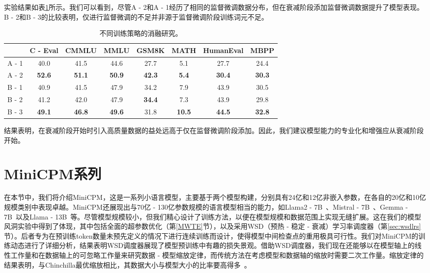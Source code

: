 实验结果如表\ref{tab:dataexperiments}所示。我们可以看到，尽管A - 2和A - 1经历了相同的监督微调数据分布，但在衰减阶段添加监督微调数据提升了模型表现。B - 2和B - 3的比较表明，仅进行监督微调的不足并非源于监督微调阶段训练词元不足。 

\begin{table}[h]
\centering
\begin{tabular}{lccccccc}
\toprule
            & \textbf{C - Eval} & \textbf{CMMLU} & \textbf{MMLU} & \textbf{GSM8K} & \textbf{MATH} & \textbf{HumanEval} & \textbf{MBPP} \\ \midrule
A - 1 & 40.0  & 41.5  & 44.6 & 27.7  & 5.1  & 27.7      & 24.4 \\
A - 2 & \textbf{52.6}  & \textbf{51.1} & \textbf{50.9} & \textbf{42.3 } & \textbf{5.4}  & \textbf{30.4 }     & \textbf{30.3} \\
\midrule

B - 1 &   40.9  & 41.5 & 47.9 &  34.2 & 7.9   &  43.9 & 30.5 \\
B - 2 &  41.2 &  42.0 &    47.9  & \textbf{34.4} & 7.3 &  43.9 & 29.8  \\ 
B - 3 & \textbf{49.1}  & \textbf{46.8}  & \textbf{49.6} & 31.8  & \textbf{10.5}  & \textbf{44.5}  & \textbf{32.8}\\
\bottomrule
\end{tabular}
\caption{不同训练策略的消融研究。
}
\label{tab:dataexperiments}
\end{table}

结果表明，在衰减阶段开始时引入高质量数据的益处远高于仅在监督微调阶段添加。因此，我们建议模型能力的专业化和增强应从衰减阶段开始。 

\section{MiniCPM系列}


在本节中，我们将介绍MiniCPM，这是一系列小语言模型，主要基于两个模型构建，分别具有24亿和12亿非嵌入参数，在各自的20亿和10亿规模类别中表现卓越。MiniCPM还展现出与70亿 - 130亿参数规模的语言模型相当的能力，如Llama2 - 7B~\citep{touvron2023llama}、Mistral - 7B~\citep{jiang2023mistral}、Gemma - 7B~\citep{Banks2024Gemma}以及Llama - 13B~\citep{touvron2023llama}等。尽管模型规模较小，但我们精心设计了训练方法，以便在模型规模和数据范围上实现无缝扩展。这在我们的模型风洞实验中得到了体现，其中包括全面的超参数优化（第\ref{MWTE}节），以及采用WSD（预热 - 稳定 - 衰减）学习率调度器（第\ref{sec:wsdlrs}节）。后者专为在预训练token数量未预先定义的情况下进行连续训练而设计，使得模型中间检查点的重用极具可行性。我们对MiniCPM的训练动态进行了详细分析，结果表明WSD调度器展现了模型预训练中有趣的损失景观。借助WSD调度器，我们现在还能够以在模型轴上的线性工作量和在数据轴上的可忽略工作量来研究数据 - 模型缩放定律，而传统方法在考虑模型和数据轴的缩放时需要二次工作量。缩放定律的结果表明，与Chinchilla最优缩放相比，其数据大小与模型大小的比率要高得多~\citep{hoffmann2022training}。

